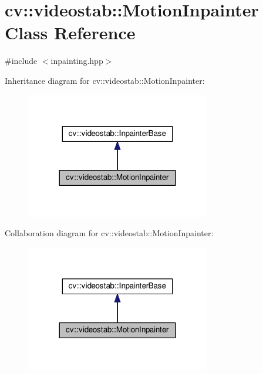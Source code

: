 \hypertarget{classcv_1_1videostab_1_1MotionInpainter}{\section{cv\-:\-:videostab\-:\-:Motion\-Inpainter Class Reference}
\label{classcv_1_1videostab_1_1MotionInpainter}
}


{\ttfamily \#include $<$inpainting.\-hpp$>$}



Inheritance diagram for cv\-:\-:videostab\-:\-:Motion\-Inpainter\-:\nopagebreak
\begin{figure}[H]
\begin{center}
\leavevmode
\includegraphics[width=228pt]{classcv_1_1videostab_1_1MotionInpainter__inherit__graph}
\end{center}
\end{figure}


Collaboration diagram for cv\-:\-:videostab\-:\-:Motion\-Inpainter\-:\nopagebreak
\begin{figure}[H]
\begin{center}
\leavevmode
\includegraphics[width=228pt]{classcv_1_1videostab_1_1MotionInpainter__coll__graph}
\end{center}
\end{figure}
